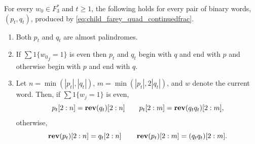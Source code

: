 \documentclass[12pt]{amsart}
\begin{document}
\begin{lemma} \label{lemma:almost_palindrome}
	For every $w_0 \in F_3^*$ and $t \geq 1$, the following holds for every pair of binary words, $(p_t,q_t)$, produced by \eqref{eq:child_farey_quad_continuedfrac}.
	\begin{enumerate}
		\item Both $p_t$ and $q_t$ are almost palindromes.
		\item If $\sum 1\{ {w_{0}}_j = 1\}$ is even then $p_t$ and $q_t$ begin with $q$ and end with $p$
		and otherwise begin with $p$ and end with $q$. 
		\item Let $n = \min(|p_t|, |q_t|)$, $m = \min(|p_t|, 2|q_t|)$, and $w$ denote the current word. Then, 
		if $\sum 1\{ w_j = 1\}$ is even,
		\[
		p_t[2:n] = \mathop{\bf rev}(q_t)[2:n] \qquad p_t[2:m] = \mathop{\bf rev}(q_tq_t)[2:m],
		\]
		otherwise,
		\[
		\mathop{\bf rev}(p_t)[2:n] = q_t[2:n] \qquad \mathop{\bf rev}(p_t)[2:m] = (q_tq_t)[2:m].
		\]

	\end{enumerate}
\end{lemma}
\end{document}
